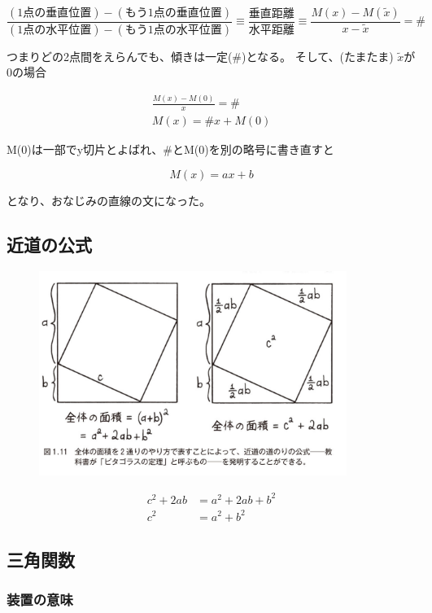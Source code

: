 \documentclass[dvipdfmx]{jsarticle}
\begin{document}
\[ \frac{(1点の垂直位置) - (もう1点の垂直位置)}{(1点の水平位置) - (もう1点の水平位置)} \equiv \frac{垂直距離}{水平距離} \equiv \frac{M(x) - M(\tilde{x})}{x - \tilde{x}}  = \# \]

つまりどの2点間をえらんでも、傾きは一定(\#)となる。 そして、(たまたま) $\tilde{x}$が0の場合

\begin{align*}
  \frac{M(x) - M(0)}{x} = \# \\
  M(x) = \#x + M(0)
\end{align*}

M(0)は一部でy切片とよばれ、\#とM(0)を別の略号に書き直すと

\[ M(x) = ax + b \]

となり、おなじみの直線の文になった。

\subsection{近道の公式}

\begin{figure}[h]
  \centering
  \includegraphics[width=10cm]{images/burn_math_1-11.png}
\end{figure}

\begin{align*}
  c^2 + 2ab &= a^2 + 2ab + b^2 \\
  c^2 &= a^2 + b^2
\end{align*}

\subsection{三角関数}

\subsubsection{装置の意味}
\end{document}

